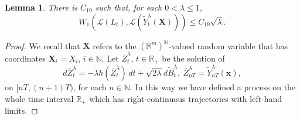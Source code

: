 \documentclass[a4paper,draft]{article}
\newtheorem{lemma}[theorem]{Lemma}
\begin{document}
\begin{lemma}\label{vizier} There is
$C_{19}$ such that,
for each $0<\lambda\leq 1$,
$$
W_1(\mathcal{L}(L_t),\mathcal{L}(\tilde{Y}^{\lambda}_t(\mathbf{X})))\leq C_{19}\sqrt{\lambda}.
$$
\end{lemma}
\begin{proof} We recall that
$\mathbf{X}$ refers to the $(\mathbb{R}^m)^{\mathbb{N}}$-valued random variable that has coordinates
$\mathbf{X}_i=X_i$, $i\in\mathbb{N}$.
Let $\overline{Z}^{\lambda}_t$, $t\in\mathbb{R}_+$ be the solution of
$$
d\overline{Z}^{\lambda}_t=-\lambda h(\overline{Z}^{\lambda}_t)\, dt+\sqrt{2\lambda}d\tilde{B}^{\lambda}_t,\
\overline{Z}^{\lambda}_{nT}=\tilde{Y}^{\lambda}_{nT}(\mathbf{x}),
$$
on $[nT,(n+1)T)$, for each $n\in\mathbb{N}$. In this way we have defined
a process on the whole time interval $\mathbb{R}_+$ which has right-continuous trajectories with left-hand limits.


\end{proof}
\end{document}
